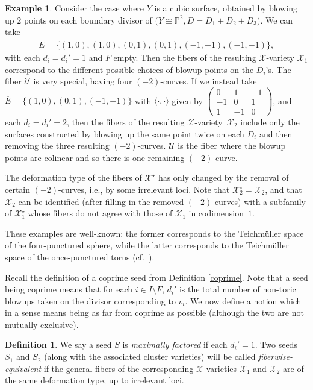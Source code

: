 \documentclass[pdftex]{sigma}
\numberwithin{equation}{section}
\numberwithin{figure}{section}
\numberwithin{table}{section}
\let\?=\overline
\let\bb=\mathbb
\let\s=\mathcal
\theoremstyle{definition}
\newtheorem{dfn}[thm]{Definition}
\newtheorem{eg}[thm]{Example}
\begin{document}
\begin{eg}\label{cubic cluster}
Consider the case where $Y$ is a cubic surface, obtained by blowing up $2$ points on each boundary divisor of $\big(\?{Y}\cong \bb{P}^2,\?{D}=D_1+D_2+D_3\big)$. We can take
\begin{gather*}
	\?{E}=\{(1,0),(1,0),(0,1),(0,1),(-1,-1),(-1,-1)\},
\end{gather*}
with each $d_i=d_i'=1$ and $F$ empty. Then the fibers of the resulting $\s{X}$-variety $\s{X}_1$ correspond to the different possible choices of blowup points on the $D_i$'s. The fiber $\s{U}$ is very special, having four $(-2)$-curves. If we instead take $\?{E}=\{(1,0),(0,1),(-1,-1)\}$ with $\langle \cdot,\cdot\rangle$ given by
	$\left(\begin{smallmatrix}
		0 &1 &-1 \\
	 -1 &0 &1 \\
	 1 &-1 &0
		\end{smallmatrix}\right)$,
		and each $d_i=d_i'=2$, then the fibers of the resulting $\s{X}$-variety~$\s{X}_2$ include only the surfaces constructed by blowing up the same point twice on each $D_i$ and then removing the three resulting $(-2)$-curves. $\s{U}$ is the fiber where the blowup points are colinear and so there is one remaining $(-2)$-curve.
		
The deformation type of the fibers of $\s{X}^{\star}$ has only changed by the removal of certain $(-2)$-curves, i.e., by some irrelevant loci. Note that $\s{X}^{\star}_2=\s{X}_2$, and that $\s{X}_2$ can be identified (after filling in the removed $(-2)$-curves) with a subfamily of $\s{X}^{\star}_1$ whose fibers do not agree with those of $\s{X}_1$ in codimension~$1$.

These examples are well-known: the former corresponds to the Teichm\"{u}ller space of the four-punctured sphere, while the latter corresponds to the Teichm\"{u}ller space of the once-punctured torus (cf.\ \cite[Section~2.7]{FG1}).
\end{eg}

Recall the definition of a coprime seed from Definition \ref{coprime}. Note that a seed being coprime means that for each $i\in I\setminus F$, $d_i'$ is the total number of non-toric blowups taken on the divisor corresponding to $v_i$. We now define a notion which in a sense means being as far from coprime as possible (although the two are not mutually exclusive).

\begin{dfn}\label{EquivalentClusters} We say a seed $S$ is {\it maximally factored} if each $d_i'=1$. Two seeds $S_1$ and $S_2$ (along with the associated cluster varieties) will be called {\it fiberwise-equivalent} if the general fibers of the corresponding $\s{X}$-varieties $\s{X}_1$ and $\s{X}_2$ are of the same deformation type, up to irrelevant loci.
\end{dfn}
\end{document}

